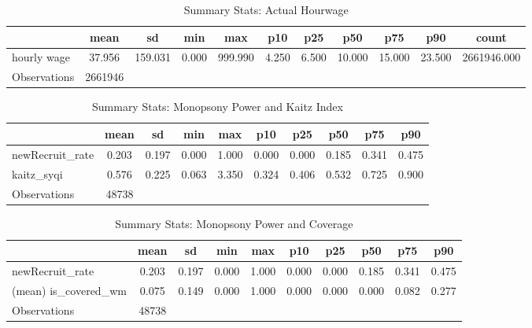\begin{table}[htbp]\centering
\def\sym#1{\ifmmode^{#1}\else\(^{#1}\)\fi}
\caption{Summary Stats: Actual Hourwage}
\begin{tabular}{l*{1}{cccccccccc}}
\hline\hline
                    &        mean&          sd&         min&         max&         p10&         p25&         p50&         p75&         p90&       count\\
\hline
hourly wage         &      37.956&     159.031&       0.000&     999.990&       4.250&       6.500&      10.000&      15.000&      23.500& 2661946.000\\
\hline
Observations        &     2661946&            &            &            &            &            &            &            &            &            \\
\hline\hline
\end{tabular}
\end{table}
\begin{table}[htbp]\centering
\def\sym#1{\ifmmode^{#1}\else\(^{#1}\)\fi}
\caption{Summary Stats: Monopsony Power and Kaitz Index}
\begin{tabular}{l*{1}{ccccccccc}}
\hline\hline
                    &        mean&          sd&         min&         max&         p10&         p25&         p50&         p75&         p90\\
\hline
newRecruit\_rate     &       0.203&       0.197&       0.000&       1.000&       0.000&       0.000&       0.185&       0.341&       0.475\\
kaitz\_syqi          &       0.576&       0.225&       0.063&       3.350&       0.324&       0.406&       0.532&       0.725&       0.900\\
\hline
Observations        &       48738&            &            &            &            &            &            &            &            \\
\hline\hline
\end{tabular}
\end{table}
\begin{table}[htbp]\centering
\def\sym#1{\ifmmode^{#1}\else\(^{#1}\)\fi}
\caption{Summary Stats: Monopsony Power and Coverage}
\begin{tabular}{l*{1}{ccccccccc}}
\hline\hline
                    &        mean&          sd&         min&         max&         p10&         p25&         p50&         p75&         p90\\
\hline
newRecruit\_rate     &       0.203&       0.197&       0.000&       1.000&       0.000&       0.000&       0.185&       0.341&       0.475\\
(mean) is\_covered\_wm&       0.075&       0.149&       0.000&       1.000&       0.000&       0.000&       0.000&       0.082&       0.277\\
\hline
Observations        &       48738&            &            &            &            &            &            &            &            \\
\hline\hline
\end{tabular}
\end{table}
